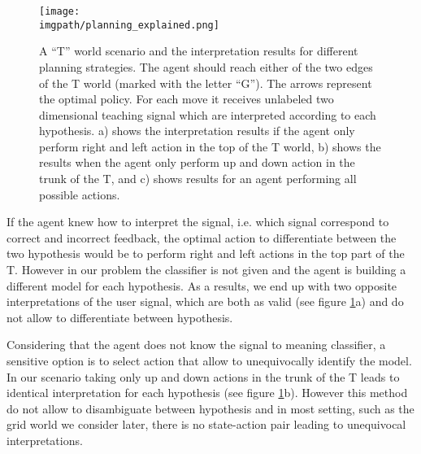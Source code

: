 \begin{figure}[!ht]
  \centering
      \texttt{[image: \\imgpath/planning\_explained.png]}
      \caption{A ``T'' world scenario and the interpretation results for different planning strategies. The agent should reach either of the two edges of the T world (marked with the letter ``G''). The arrows represent the optimal policy. For each move it receives unlabeled two dimensional teaching signal which are interpreted according to each hypothesis. a) shows the interpretation results if the agent only perform right and left action in the top of the T world, b) shows the results when the agent only perform up and down action in the trunk of the T, and c) shows results for an agent performing all possible actions.}
    \label{fig:planningExplained}
\end{figure}

If the agent knew how to interpret the signal, i.e. which signal correspond to correct and incorrect feedback, the optimal action to differentiate between the two hypothesis would be to perform right and left actions in the top part of the T. However in our problem the classifier is not given and the agent is building a different model for each hypothesis. As a results, we end up with two opposite interpretations of the user signal, which are both as valid (see figure \ref{fig:planningExplained}a) and do not allow to differentiate between hypothesis.

Considering that the agent does not know the signal to meaning classifier, a sensitive option is to select action that allow to unequivocally identify the model. In our scenario taking only up and down actions in the trunk of the T leads to identical interpretation for each hypothesis (see figure \ref{fig:planningExplained}b). However this method do not allow to disambiguate between hypothesis and in most setting, such as the grid world we consider later, there is no state-action pair leading to unequivocal interpretations.

